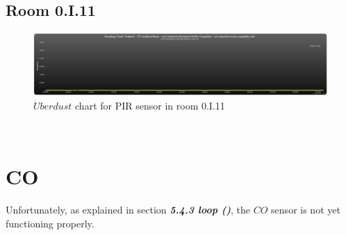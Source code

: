 \documentclass[12pt,a4paper]{report}
\begin{document}
\subsection{Room 0.I.11}
%
\begin{figure}[H]
\centering
	\includegraphics*[width=\textwidth]{ch4_11}
	\caption{$\ddot{U}berdust$ chart for PIR sensor in room 0.I.11}
	\label{chart_ch4_11}
\end{figure}
\ \\
%
\section{CO}
%
Unfortunately, as explained in section \textit{\textbf{5.4.3 loop ()}}, the $CO$ sensor is not yet functioning properly.
\newpage
%
\end{document}
